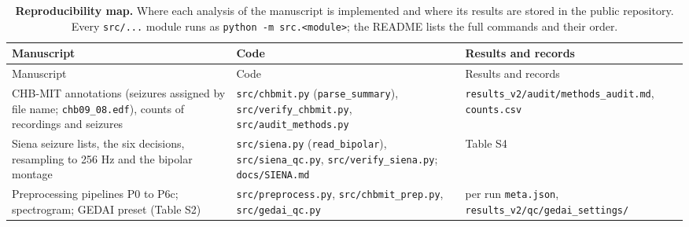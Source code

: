 \documentclass[11pt,a4paper]{article}
\begin{document}
\endgroup

\begingroup\small

\begin{longtable}[]{@{}
  >{\raggedright\arraybackslash}p{}
  >{\raggedright\arraybackslash}p{}
  >{\raggedright\arraybackslash}p{}@{}}
\caption{\textbf{Reproducibility map.} Where each analysis of the manuscript is implemented and where its results are stored in the public repository. Every \nolinkurl{src/...} module runs as \protect\texttt{python\ -m\ src.\textless{}module\textgreater{}}; the README lists the full commands and their order.}\tabularnewline
\toprule\noalign{}
\begin{minipage}[b]{\linewidth}\raggedright
Manuscript
\end{minipage} & \begin{minipage}[b]{\linewidth}\raggedright
Code
\end{minipage} & \begin{minipage}[b]{\linewidth}\raggedright
Results and records
\end{minipage} \\
\midrule\noalign{}
\endfirsthead
\toprule\noalign{}
\begin{minipage}[b]{\linewidth}\raggedright
Manuscript
\end{minipage} & \begin{minipage}[b]{\linewidth}\raggedright
Code
\end{minipage} & \begin{minipage}[b]{\linewidth}\raggedright
Results and records
\end{minipage} \\
\midrule\noalign{}
\endhead
\bottomrule\noalign{}
\endlastfoot
2.1 CHB-MIT annotations (seizures assigned by file name; \nolinkurl{chb09_08.edf}), counts of recordings and seizures & \nolinkurl{src/chbmit.py} (\nolinkurl{parse_summary}), \nolinkurl{src/verify_chbmit.py}, \nolinkurl{src/audit_methods.py} & \nolinkurl{results_v2/audit/methods_audit.md}, \nolinkurl{counts.csv} \\
2.1 Siena seizure lists, the six decisions, resampling to 256 Hz and the bipolar montage & \nolinkurl{src/siena.py} (\nolinkurl{read_bipolar}), \nolinkurl{src/siena_qc.py}, \nolinkurl{src/verify_siena.py}; \nolinkurl{docs/SIENA.md} & Table S4 \\
2.2 Preprocessing pipelines P0 to P6c; spectrogram; GEDAI preset (Table S2) & \nolinkurl{src/preprocess.py}, \nolinkurl{src/chbmit_prep.py}, \nolinkurl{src/gedai_qc.py} & per run \nolinkurl{meta.json}, \nolinkurl{results_v2/qc/gedai_settings/} \\

\end{longtable}
\end{document}
